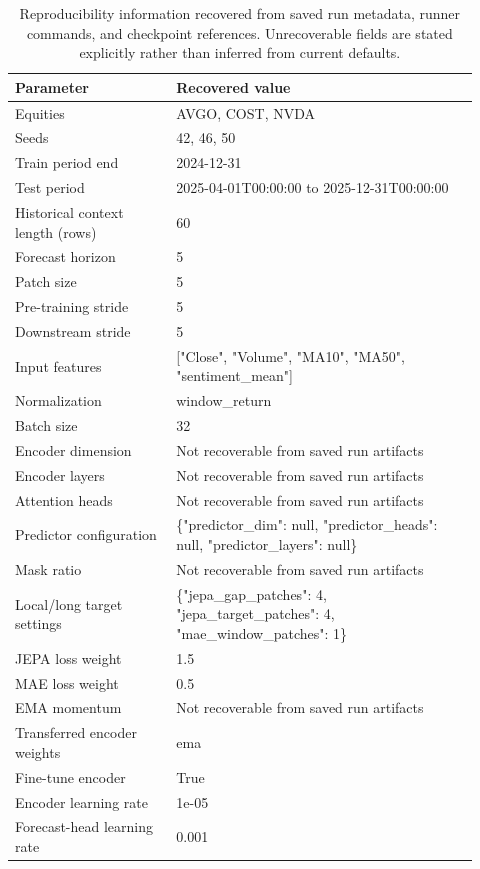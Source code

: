 \begin{table}[p]
\centering
\small
\caption{Reproducibility information recovered from saved run metadata, runner commands, and checkpoint references. Unrecoverable fields are stated explicitly rather than inferred from current defaults.}
\label{tab:reproducibility}
\begin{tabular}{p{0.32\linewidth}p{0.60\linewidth}}
\toprule
Parameter & Recovered value \\
\midrule
Equities & AVGO, COST, NVDA \\
Seeds & 42, 46, 50 \\
Train period end & 2024-12-31 \\
Test period & 2025-04-01T00:00:00 to 2025-12-31T00:00:00 \\
Historical context length (rows) & 60 \\
Forecast horizon & 5 \\
Patch size & 5 \\
Pre-training stride & 5 \\
Downstream stride & 5 \\
Input features & ["Close", "Volume", "MA10", "MA50", "sentiment\_mean"] \\
Normalization & window\_return \\
Batch size & 32 \\
Encoder dimension & Not recoverable from saved run artifacts \\
Encoder layers & Not recoverable from saved run artifacts \\
Attention heads & Not recoverable from saved run artifacts \\
Predictor configuration & \{"predictor\_dim": null, "predictor\_heads": null, "predictor\_layers": null\} \\
Mask ratio & Not recoverable from saved run artifacts \\
Local/long target settings & \{"jepa\_gap\_patches": 4, "jepa\_target\_patches": 4, "mae\_window\_patches": 1\} \\
JEPA loss weight & 1.5 \\
MAE loss weight & 0.5 \\
EMA momentum & Not recoverable from saved run artifacts \\
Transferred encoder weights & ema \\
Fine-tune encoder & True \\
Encoder learning rate & 1e-05 \\
Forecast-head learning rate & 0.001 \\

\end{tabular}
\end{table}
